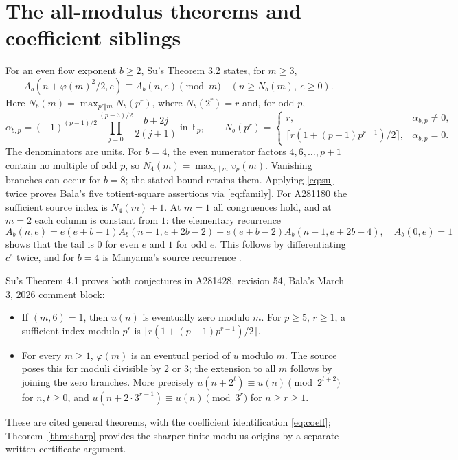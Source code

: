 \documentclass[11pt]{article}
\newcommand{\F}{\mathbb F}
\begin{document}
\section{The all-modulus theorems and coefficient siblings}
For an even flow exponent $b\geq2$, Su's Theorem 3.2 states, for $m\geq3$,
\begin{equation}\label{eq:su}
 A_b(n+\varphi(m)^2/2,e)\equiv A_b(n,e)\pmod m
 \quad(n\geq N_b(m),\ e\geq0).
\end{equation}
Here $N_b(m)=\max_{p^r\Vert m}N_b(p^r)$, where $N_b(2^r)=r$ and,
for odd $p$,
\[
 \alpha_{b,p}=(-1)^{(p-1)/2}
 \prod_{j=0}^{(p-3)/2}\frac{b+2j}{2(j+1)}\ \text{in }\F_p,\qquad
 N_b(p^r)=\begin{cases}
 r,&\alpha_{b,p}\ne0,\\
 \lceil r(1+(p-1)p^{r-1})/2\rceil,&\alpha_{b,p}=0.
 \end{cases}
\]
The denominators are units. For $b=4$, the even numerator factors
$4,6,\ldots,p+1$ contain no multiple of odd $p$, so
$N_4(m)=\max_{p\mid m}v_p(m)$. Vanishing branches can occur for $b=8$;
the stated bound retains them. Applying \eqref{eq:su} twice proves
Bala's five totient-square assertions via \eqref{eq:family}.
For A281180 the sufficient source index is $N_4(m)+1$.
At $m=1$ all congruences hold, and at $m=2$ each column is constant
from $1$: the elementary recurrence
\begin{equation}\label{eq:rec}
 A_b(n,e)=e(e+b-1)A_b(n-1,e+2b-2)
          -e(e+b-2)A_b(n-1,e+2b-4),\quad A_b(0,e)=1
\end{equation}
shows that the tail is $0$ for even $e$ and $1$ for odd $e$.
This follows by differentiating $c^e$ twice, and for $b=4$ is
Manyama's source recurrence \cite{oeis184}.

Su's Theorem 4.1 proves both conjectures in A281428, revision 54,
Bala's March 3, 2026 comment block:
\begin{itemize}
\item If $(m,6)=1$, then $u(n)$ is eventually zero modulo $m$.
For $p\geq5$, $r\geq1$, a sufficient index modulo $p^r$ is
$\lceil r(1+(p-1)p^{r-1})/2\rceil$.
\item For every $m\geq1$, $\varphi(m)$ is an eventual period of $u$
modulo $m$. The source poses this for moduli divisible by $2$ or $3$;
the extension to all $m$ follows by joining the zero branches.
More precisely $u(n+2^t)\equiv u(n)\pmod{2^{t+2}}$ for $n,t\geq0$,
and $u(n+2\cdot3^{r-1})\equiv u(n)\pmod{3^r}$ for $n\geq r\geq1$.
\end{itemize}
These are cited general theorems, with the coefficient identification
\eqref{eq:coeff}; Theorem~\ref{thm:sharp} provides the sharper finite-modulus
origins by a separate written certificate argument.
\end{document}
